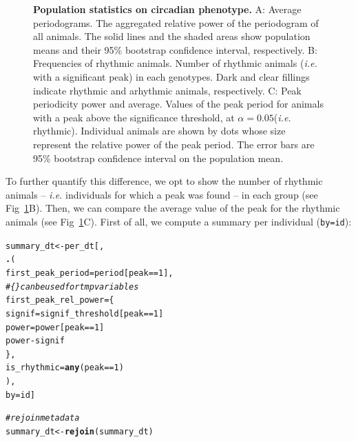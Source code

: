 \documentclass[10pt,letterpaper]{article}\usepackage[]{graphicx}\usepackage[]{color}
\makeatletter
\newcommand{\hlnum}[1]{\textcolor[rgb]{0.686,0.059,0.569}{#1}}%
\newcommand{\hlcom}[1]{\textcolor[rgb]{0.678,0.584,0.686}{\textit{#1}}}%
\newcommand{\hlopt}[1]{\textcolor[rgb]{0,0,0}{#1}}%
\newcommand{\hlstd}[1]{\textcolor[rgb]{0.345,0.345,0.345}{#1}}%
\newcommand{\hlkwb}[1]{\textcolor[rgb]{0.69,0.353,0.396}{#1}}%
\newcommand{\hlkwc}[1]{\textcolor[rgb]{0.333,0.667,0.333}{#1}}%
\newcommand{\hlkwd}[1]{\textcolor[rgb]{0.737,0.353,0.396}{\textbf{#1}}}%
\newenvironment{kframe}{%
 \def\at@end@of@kframe{}%
 \ifinner\ifhmode%
  \def\at@end@of@kframe{\end{minipage}}%
  \begin{minipage}{\columnwidth}%
 \fi\fi%
 \def\FrameCommand##1{\hskip\@totalleftmargin \hskip-\fboxsep
 \colorbox{shadecolor}{##1}\hskip-\fboxsep
     \hskip-\linewidth \hskip-\@totalleftmargin \hskip\columnwidth}%
 \MakeFramed {\advance\hsize-\width
   \@totalleftmargin\z@ \linewidth\hsize
   \@setminipage}}%
 {\par\unskip\endMakeFramed%
 \at@end@of@kframe}
\newenvironment{knitrout}{}{} %
\makeatother
\begin{document}
\begin{figure}[!h]
	\caption{{\bf Population statistics on circadian phenotype.}
			A: Average periodograms. 
			      The aggregated relative power of the periodogram of all animals.
			      The solid lines and the shaded areas show population means and their 95\% bootstrap confidence interval, respectively.
			B: Frequencies of rhythmic animals.
			      Number of rhythmic animals (\emph{i.e.} with a significant peak) in each genotypes.
			      Dark and clear fillings indicate rhythmic and arhythmic animals, respectively.
      C: Peak periodicity power and average.
			      Values of the peak period for animals with a peak above the significance threshold, at $\alpha = 0.05$(\emph{i.e.} rhythmic).
			      Individual animals are shown by dots whose size represent the relative power of the peak period.
			      The error bars are 95\% bootstrap confidence interval on the population mean.
			      }
	\label{fig:fig-5}
\end{figure}


To further quantify this difference, we opt to show the number of rhythmic animals -- \emph{i.e.} individuals for which a peak was found -- in each group (see Fig~\ref{fig:fig-5}B).
Then, we can compare the average value of the peak for the rhythmic animals (see Fig~\ref{fig:fig-5}C).
First of all, we compute a summary per individual (\texttt{by=id}):

\begin{knitrout}
\color{fgcolor}\begin{kframe}
\begin{alltt}
\hlstd{summary_dt} \hlkwb{<-} \hlstd{per_dt[,}
                \hlkwd{.}\hlstd{(}
                  \hlkwc{first_peak_period} \hlstd{= period[peak} \hlopt{==} \hlnum{1}\hlstd{],}
                  \hlcom{# \{\} can be used for tmp variables}
                  \hlkwc{first_peak_rel_power} \hlstd{= \{}
                    \hlstd{signif} \hlkwb{=} \hlstd{signif_threshold[peak} \hlopt{==} \hlnum{1}\hlstd{]}
                    \hlstd{power} \hlkwb{=} \hlstd{power[peak} \hlopt{==} \hlnum{1}\hlstd{]}
                    \hlstd{power} \hlopt{-} \hlstd{signif}
                  \hlstd{\},}
                  \hlkwc{is_rhythmic} \hlstd{=} \hlkwd{any}\hlstd{(peak} \hlopt{==} \hlnum{1}\hlstd{)}
                \hlstd{),}
                \hlkwc{by}\hlstd{=id]}

\hlcom{# rejoin metadata}
\hlstd{summary_dt} \hlkwb{<-} \hlkwd{rejoin}\hlstd{(summary_dt)}
\end{alltt}
\end{kframe}
\end{knitrout}
\end{document}
